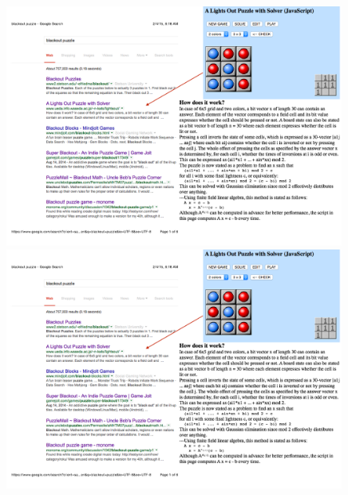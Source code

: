 \begin{figure}[t!]
\centering
\vspace*{-0ex}%

\includegraphics[width=0.99\textwidth]{fg-key-blackp-descr-a}
\vspace*{1ex}%
\\
\includegraphics[width=0.99\textwidth]{fg-key-blackp-descr-a}

\end{figure}
